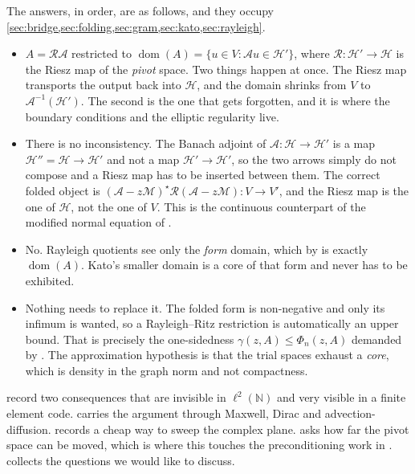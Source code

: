 \documentclass[11pt,a4paper]{article}
\theoremstyle{plain}
\newcommand{\N}{\mathbb{N}}
\newcommand{\Hb}{\mathcal{H}}
\newcommand{\Vb}{V}
\newcommand{\Aop}{\mathcal{A}}
\DeclareMathOperator{\dom}{dom}
\newcommand{\adj}{\star}                 %
\newcommand{\Riesz}{\mathcal{R}}         %
\newcommand{\Mass}{\mathcal{M}}          %
\begin{document}
The answers, in order, are as follows, and they occupy
\cref{sec:bridge,sec:folding,sec:gram,sec:kato,sec:rayleigh}.

\begin{itemize}
  \item[(1)] $A = \Riesz \Aop$ restricted to $\dom(A) = \{u \in \Vb : \Aop u
        \in \Hb'\}$, where $\Riesz \colon \Hb' \to \Hb$ is the Riesz map of the
        \emph{pivot} space.  Two things happen at once.  The Riesz map
        transports the output back into $\Hb$, and the domain shrinks from $\Vb$
        to $\Aop^{-1}(\Hb')$.  The second is the one that gets forgotten, and it
        is where the boundary conditions and the elliptic regularity live.
  \item[(2)] There is no inconsistency.  The Banach adjoint of $\Aop \colon \Hb
        \to \Hb'$ is a map $\Hb'' = \Hb \to \Hb'$ and not a map $\Hb' \to \Hb'$,
        so the two arrows simply do not compose and a Riesz map has to be
        inserted between them.  The correct folded object is $(\Aop -
        z\Mass)^{\adj}\Riesz(\Aop - z\Mass) \colon \Vb \to \Vb'$, and the Riesz
        map is the one of $\Hb$, not the one of $\Vb$.  This is the continuous
        counterpart of the modified normal equation of
        \cite[Equation~(3.7)]{LazzarinoNakatsukasaZerbinati2026}.
  \item[(3)] No.  Rayleigh quotients see only the \emph{form} domain, which by
        \cite[Example~VI.2.13, p.~326]{Kato1995} is exactly $\dom(A)$.  Kato's
        smaller domain is a core of that form and never has to be exhibited.
  \item[(4)] Nothing needs to replace it.  The folded form is non-negative and
        only its infimum is wanted, so a Rayleigh--Ritz restriction is
        automatically an upper bound.  That is precisely the one-sidedness
        $\gamma(z,A) \le \Phi_n(z,A)$ demanded by
        \cite[Assumption~3.2.1]{Colbrook2026}.  The approximation hypothesis is
        that the trial spaces exhaust a \emph{core}, which is density in the
        graph norm and not compactness.
\end{itemize}

 record two consequences that are invisible
in $\ell^2(\N)$ and very visible in a finite element code.  
carries the argument through Maxwell, Dirac and advection-diffusion.
 records a cheap way to sweep the complex plane.
 asks how far the pivot space can be moved, which is where this
touches the preconditioning work in
\cite{LazzarinoNakatsukasaZerbinati2026}.   collects the
questions we would like to discuss.
\end{document}
